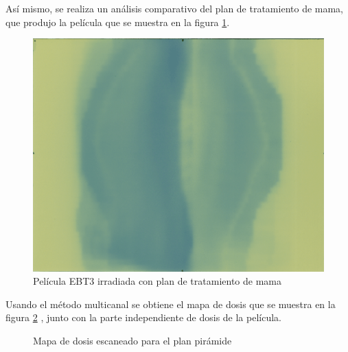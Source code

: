 Así mismo, se realiza un análisis comparativo del plan de tratamiento de mama, que produjo la película que se muestra en la figura \ref{fig:mamaEscaneada}.\\
\begin{figure}[H]
	\centering
	\includegraphics[width=0.7\linewidth]{images/peliculaMama.png}
	\caption{Película EBT3 irradiada con plan de tratamiento de mama }
	\label{fig:mamaEscaneada}
\end{figure}
Usando el método multicanal se obtiene el mapa de dosis que se muestra en la figura \ref{fig:mapaMAma} , junto con la parte independiente de dosis de la película.
\begin{figure}[H]
	\centering
	\hfill
	\caption{Mapa de dosis escaneado para el plan pirámide}
	\label{fig:mapaMAma}
\end{figure}

